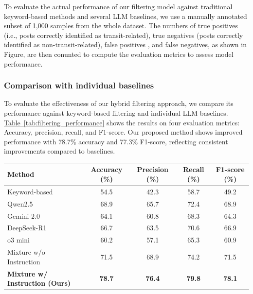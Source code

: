 \documentclass[a4paper,fleqn,12pt]{cas-sc}
\begin{document}
To evaluate the actual performance of our filtering model against traditional keyword-based methods and several LLM baselines, we use a manually annotated subset of 1,000 samples from the whole dataset. The numbers of true positives (i.e., posts correctly identified as transit-related), true negatives (posts correctly identified as non-transit-related), false positives , and false negatives, as shown in Figure,  are then conunted to compute the evaluation metrics to assess model performance.

\subsubsection{Comparison with individual baselines}

To evaluate the effectiveness of our hybrid filtering approach, we compare its performance against keyword-based filtering and individual LLM baselines. \hyperref[tab:filtering_performance]{Table~\ref{tab:filtering_performance}} shows the results on four evaluation metrics: Accuracy, precision, recall, and F1-score. Our proposed method shows improved performance with 78.7\% accuracy and 77.3\% F1-score, reflecting consistent improvements compared to baselines.

\begin{center}
\label{tab:filtering_performance}
\begin{tabular}{lcccc}
\toprule
Method & Accuracy (\%) & Precision (\%) & Recall (\%) & F1-score (\%) \\
\midrule
Keyword-based & 54.5 & 42.3 & 58.7 & 49.2 \\
Qwen2.5 & 68.9 & 65.7 & 72.4 & 68.9 \\
Gemini-2.0 & 64.1 & 60.8 & 68.3 & 64.3 \\
DeepSeek-R1 & 66.7 & 63.5 & 70.6 & 66.9 \\
o3 mini & 60.2 & 57.1 & 65.3 & 60.9 \\
Mixture w/o Instruction & 71.5 & 68.9 & 74.2 & 71.5 \\
\textbf{Mixture w/ Instruction (Ours)} & \textbf{78.7} & \textbf{76.4} & \textbf{79.8} & \textbf{78.1} \\
\bottomrule
\end{tabular}
\end{center}
\end{document}
